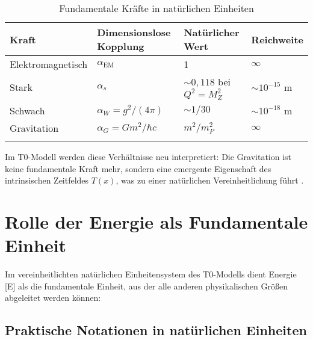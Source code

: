 \documentclass[12pt,a4paper]{article}
\newcommand{\Tfield}{T(x)}
\newcommand{\alphaEM}{\alpha_{\text{EM}}}
\begin{document}
	\begin{table}[ht]
		\centering
		\begin{adjustbox}{scale=0.95}
			\begin{tabular}{llll}
				\hline
				\textbf{Kraft} & \textbf{Dimensionslose Kopplung} & \textbf{Natürlicher Wert} & \textbf{Reichweite} \\
				\hline
				Elektromagnetisch & $\alphaEM$ & 1 & $\infty$ \\
				Stark & $\alpha_s$ & $\sim 0,118$ bei $Q^2=M_Z^2$ & $\sim 10^{-15}$ m \\
				Schwach & $\alpha_W = g^2/(4\pi)$ & $\sim 1/30$ & $\sim 10^{-18}$ m \\
				Gravitation & $\alpha_G = Gm^2/\hbar c$ & $m^2/m_P^2$ & $\infty$ \\
				\hline
				\multicolumn{3}{c}{} \\
				\hline
			\end{tabular}
		\end{adjustbox}
		\caption{Fundamentale Kräfte in natürlichen Einheiten}
		\label{tab:forces}
	\end{table}
	
	Im T0-Modell werden diese Verhältnisse neu interpretiert: Die Gravitation ist keine fundamentale Kraft mehr, sondern eine emergente Eigenschaft des intrinsischen Zeitfeldes $\Tfield$, was zu einer natürlichen Vereinheitlichung führt \cite{pascher_grundkraefte_2025}.
	
	\section{Rolle der Energie als Fundamentale Einheit}
	
	Im vereinheitlichten natürlichen Einheitensystem des T0-Modells dient Energie [E] als die fundamentale Einheit, aus der alle anderen physikalischen Größen abgeleitet werden können:
	
	\subsection{Praktische Notationen in natürlichen Einheiten}
	
\end{document}
